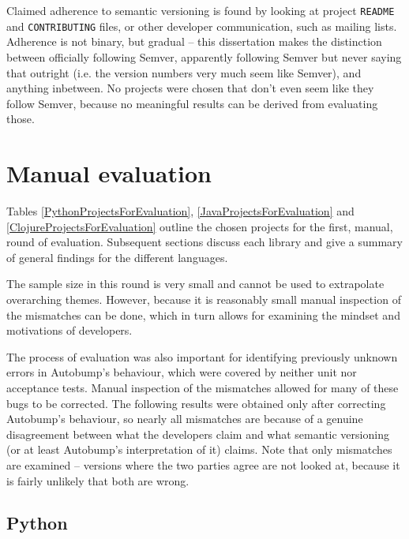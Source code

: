 \documentclass{l4proj}
\newcommand\genericstyle{\lstset{basicstyle=\ttm}}
\newcommand\codeinline[1]{{\genericstyle\lstinline!#1!}}
\begin{document}
Claimed adherence to semantic versioning is found by looking at
project \codeinline{README} and \codeinline{CONTRIBUTING} files, or
other developer communication, such as mailing lists. Adherence is not
binary, but gradual -- this dissertation makes the distinction between
officially following Semver, apparently following Semver but never
saying that outright (i.e. the version numbers very much seem like
Semver), and anything inbetween. No projects were chosen that don't
even seem like they follow Semver, because no meaningful results can
be derived from evaluating those.

\section{Manual evaluation}

Tables \ref{PythonProjectsForEvaluation},
\ref{JavaProjectsForEvaluation} and \ref{ClojureProjectsForEvaluation}
outline the chosen projects for the first, manual, round of
evaluation. Subsequent sections discuss each library and give a
summary of general findings for the different languages.

The sample size in this round is very small and cannot be used to
extrapolate overarching themes. However, because it is reasonably
small manual inspection of the mismatches can be done, which in turn
allows for examining the mindset and motivations of developers.

The process of evaluation was also important for identifying
previously unknown errors in Autobump's behaviour, which were covered
by neither unit nor acceptance tests. Manual inspection of the
mismatches allowed for many of these bugs to be corrected. The
following results were obtained only after correcting Autobump's
behaviour, so nearly all mismatches are because of a genuine
disagreement between what the developers claim and what semantic
versioning (or at least Autobump's interpretation of it) claims. Note
that only mismatches are examined -- versions where the two parties
agree are not looked at, because it is fairly unlikely that both are
wrong.


\subsection{Python}
\end{document}
